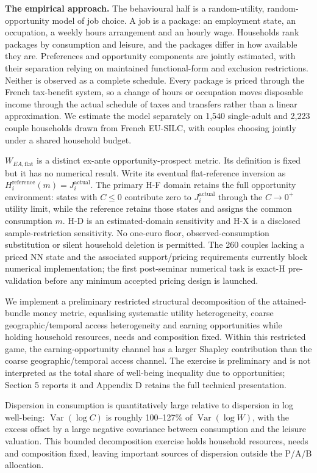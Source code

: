 \documentclass[11pt,a4paper]{article}
\begin{document}
\textbf{The empirical approach.} The behavioural half is a random-utility, random-opportunity model of job choice. A job is a package: an employment state, an occupation, a weekly hours arrangement and an hourly wage. Households rank packages by consumption and leisure, and the packages differ in how available they are. Preferences and opportunity components are jointly estimated, with their separation relying on maintained functional-form and exclusion restrictions. Neither is observed as a complete schedule. Every package is priced through the French tax-benefit system, so a change of hours or occupation moves disposable income through the actual schedule of taxes and transfers rather than a linear approximation. We estimate the model separately on 1,540 single-adult and 2,223 couple households drawn from French EU-SILC, with couples choosing jointly under a shared household budget.

\(W_{EA,\mathrm{flat}}\) is a distinct ex-ante opportunity-prospect metric. Its definition is fixed but it has no numerical result. Write its eventual flat-reference inversion as \(H_i^{\mathrm{reference}}(m)=J_i^{\mathrm{actual}}\). The primary H-F domain retains the full opportunity environment: states with \(C\leq0\) contribute zero to \(J_i^{\mathrm{actual}}\) through the \(C\rightarrow0^+\) utility limit, while the reference retains those states and assigns the common consumption \(m\). H-D is an estimated-domain sensitivity and H-X is a disclosed sample-restriction sensitivity. No one-euro floor, observed-consumption substitution or silent household deletion is permitted. The 260 couples lacking a priced NN state and the associated support/pricing requirements currently block numerical implementation; the first post-seminar numerical task is exact-H pre-validation before any minimum accepted pricing design is launched.

We implement a preliminary restricted structural decomposition of the attained-bundle money metric, equalising systematic utility heterogeneity, coarse geographic/temporal access heterogeneity and earning opportunities while holding household resources, needs and composition fixed. Within this restricted game, the earning-opportunity channel has a larger Shapley contribution than the coarse geographic/temporal access channel. The exercise is preliminary and is not interpreted as the total share of well-being inequality due to opportunities; Section 5 reports it and Appendix D retains the full technical presentation.

Dispersion in consumption is quantitatively large relative to dispersion in log well-being: \(\operatorname{Var}(\log C)\) is roughly 100--127\% of \(\operatorname{Var}(\log W)\), with the excess offset by a large negative covariance between consumption and the leisure valuation. This bounded decomposition exercise holds household resources, needs and composition fixed, leaving important sources of dispersion outside the P/A/B allocation.
\end{document}
